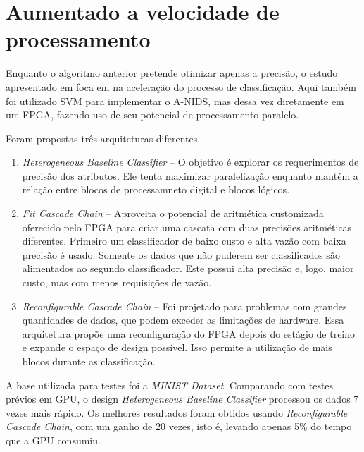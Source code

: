 \section{Aumentado a velocidade de processamento}
Enquanto o algoritmo anterior pretende otimizar apenas a precisão, o estudo apresentado em \cite{papadonikolakis12}
foca em na aceleração do processo de classificação. Aqui também foi utilizado SVM para implementar o A-NIDS, mas dessa
vez diretamente em um FPGA, fazendo uso de seu potencial de processamento paralelo.
\par Foram propostas três arquiteturas diferentes.
\begin{enumerate}
    \item \textit{Heterogeneous Baseline Classifier} -- O objetivo é explorar os requerimentos de precisão dos atributos. Ele
    tenta maximizar paralelização enquanto mantém a relação entre blocos de processamneto digital e blocos lógicos.
    \item \textit{Fit Cascade Chain} -- Aproveita o potencial de aritmética customizada oferecido pelo FPGA para criar uma
    cascata com duas precisões aritméticas diferentes. Primeiro um classificador de baixo custo e alta vazão com baixa
    precisão é usado. Somente os dados que não puderem ser classificados são alimentados ao segundo classificador. Este
    possui alta precisão e, logo, maior custo, mas com menos requisições de vazão.
    \item \textit{Reconfigurable Cascade Chain} -- Foi projetado para problemas com grandes quantidades de dados, que podem
    exceder as limitações de hardware. Essa arquitetura propõe uma reconfiguração do FPGA depois do estágio de treino e
    expande o espaço de design possível. Isso permite a utilização de mais blocos durante as classificação.
\end{enumerate}
\par A base utilizada para testes foi a \textit{MINIST Dataset}. Comparando com testes prévios em GPU, o design
\textit{Heterogeneous Baseline Classifier} processou os dados 7 vezes mais rápido. Os melhores resultados foram
obtidos usando \textit{Reconfigurable Cascade Chain}, com um ganho de 20 vezes, isto é, levando apenas 5\% do tempo
que a GPU consumiu.